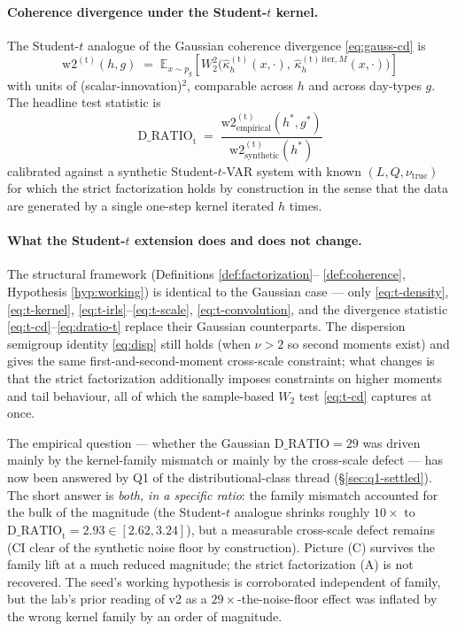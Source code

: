 \documentclass[11pt]{article}
\newcommand{\E}{\mathbb{E}}
\newcommand{\Studt}{\mathrm{t}}
\theoremstyle{definition}
\theoremstyle{plain}
\begin{document}
\paragraph{Coherence divergence under the Student-$t$ kernel.}
The Student-$t$ analogue of the Gaussian coherence divergence
\eqref{eq:gauss-cd} is
\begin{equation}
  \label{eq:t-cd}
  \mathrm{w2}^{(\Studt)}(h, g) \;=\;
  \E_{x \sim p_g}\!\left[
    W_2^{2}\bigl(\hat\kappa_h^{(\Studt)}(x, \cdot),\,
                  \hat\kappa_h^{(\Studt)\,\mathrm{iter}, M}(x, \cdot)\bigr)
  \right]
\end{equation}
with units of (scalar-innovation)$^{2}$, comparable across $h$
and across day-types $g$. The headline test statistic is
\begin{equation}
  \label{eq:dratio-t}
  \mathrm{D\_RATIO}_{\Studt}
  \;=\;
  \frac{\mathrm{w2}^{(\Studt)}_{\text{empirical}}(h^{*}, g^{*})}
       {\mathrm{w2}^{(\Studt)}_{\text{synthetic}}(h^{*})}
\end{equation}
calibrated against a synthetic Student-$t$-VAR system with known
$(L, Q, \nu_{\text{true}})$ for which the strict factorization
holds by construction in the sense that the data are generated by
a single one-step kernel iterated $h$ times.

\paragraph{What the Student-$t$ extension does and does not change.}
The structural framework (Definitions \ref{def:factorization}--%
\ref{def:coherence}, Hypothesis \ref{hyp:working}) is identical
to the Gaussian case --- only \eqref{eq:t-density},
\eqref{eq:t-kernel}, \eqref{eq:t-irls}--\eqref{eq:t-scale},
\eqref{eq:t-convolution}, and the divergence statistic
\eqref{eq:t-cd}--\eqref{eq:dratio-t} replace their Gaussian
counterparts. The dispersion semigroup identity \eqref{eq:disp}
still holds (when $\nu > 2$ so second moments exist) and gives
the same first-and-second-moment cross-scale constraint; what
changes is that the strict factorization additionally imposes
constraints on higher moments and tail behaviour, all of which
the sample-based $W_2$ test \eqref{eq:t-cd} captures at once.

The empirical question --- whether the Gaussian
$\mathrm{D\_RATIO} = 29$ was driven mainly by the kernel-family
mismatch or mainly by the cross-scale defect --- has now been
answered by Q1 of the distributional-class thread (\S\ref{sec:q1-settled}).
The short answer is \emph{both, in a specific ratio}: the family
mismatch accounted for the bulk of the magnitude (the Student-$t$
analogue shrinks roughly $10\times$ to $\mathrm{D\_RATIO}_{\Studt}
= 2.93 \in [2.62, 3.24]$), but a measurable cross-scale defect
remains (CI clear of the synthetic noise floor by construction).
Picture (C) survives the family lift at a much reduced magnitude;
the strict factorization (A) is not recovered. The seed's working
hypothesis is corroborated independent of family, but the lab's
prior reading of v2 as a $29\times$-the-noise-floor effect was
inflated by the wrong kernel family by an order of magnitude.
\end{document}
